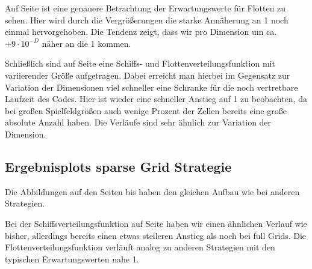 \documentclass[a4paper,12pt]{llncs}
\numberwithin{equation}{section}
\begin{document}
Auf Seite \pageref{fig:fullGrid3} ist eine genauere Betrachtung der Erwartungswerte für Flotten zu sehen. Hier wird durch die Vergrößerungen die starke Annäherung an 1 noch einmal hervorgehoben. Die Tendenz zeigt, dass wir pro Dimension um ca. $+9\cdot10^{-D}$ näher an die 1 kommen.  

Schließlich sind auf Seite \pageref{fig:fullGrid4} eine Schiffs- und Flottenverteilungsfunktion mit variierender Größe aufgetragen. Dabei erreicht man hierbei im Gegensatz zur Variation der Dimensionen viel schneller eine Schranke für die noch vertretbare Laufzeit des Codes. Hier ist wieder eine schneller Anstieg auf 1 zu beobachten, da bei großen Spielfeldgrößen auch wenige Prozent der Zellen bereits eine große absolute Anzahl haben. Die Verläufe sind sehr ähnlich zur Variation der Dimension.

\subsection{Ergebnisplots sparse Grid Strategie}

\begin{landscape}
	\label{fig:sparseGrid1}
	
\end{landscape}

\begin{landscape}
	\label{fig:sparseGrid2}
	
\end{landscape}

\begin{landscape}
	\label{fig:sparseGrid3}
	
\end{landscape}

\begin{landscape}
	\label{fig:sparseGrid4}
	
\end{landscape}

Die Abbildungen auf den Seiten \pageref{fig:sparseGrid1} bis \pageref{fig:sparseGrid4} haben den gleichen Aufbau wie bei anderen Strategien.

Bei der Schiffsverteilungsfunktion auf Seite \pageref{fig:sparseGrid1} haben wir einen ähnlichen Verlauf wie bisher, allerdings bereits einen etwas steileren Anstieg als noch bei full Grids. Die Flottenverteilungsfunktion verläuft analog zu anderen Strategien mit den typischen Erwartungswerten nahe 1.
\end{document}
